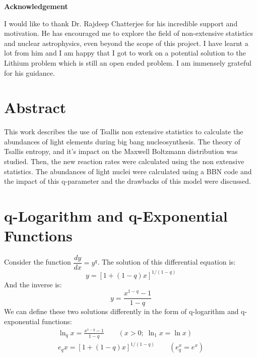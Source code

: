 \documentclass[11pt]{article}
\numberwithin{equation}{section}
\begin{document}
\begin{center}
  \Large\textbf{Acknowledgement}
\end{center}
I would like to thank Dr. Rajdeep Chatterjee for his incredible support and motivation. He has encouraged me to explore the field of non-extensive statistics and nuclear astrophysics, even beyond the scope of this project. I have learnt a lot from him and I am happy that I got to work on a potential solution to the Lithium problem which is still an open ended problem. I am immensely grateful for his guidance. 



\pagebreak
\tableofcontents
\pagebreak

\section{Abstract}

This work describes the use of Tsallis non extensive statistics to calculate the abundances of light elements during big bang nucleosynthesis. The theory of Tsallis entropy, and it's impact on the Maxwell Boltzmann distribution was studied. Then, the new reaction rates were calculated using the non extensive statistics. The abundances of light nuclei were calculated using a BBN code and the impact of this q-parameter and the drawbacks of this model were discussed. 
\pagebreak






\section{q-Logarithm and q-Exponential Functions}

Consider the function $\dfrac{dy}{dx}=y^q$. The solution of this differential equation is:
$$y=[1+(1-q)x]^{1/(1-q)}$$
And the inverse is:
$$y=\frac{x^{1-q}-1}{1-q}$$
We can define these two solutions differently in the form of q-logarithm and q-exponential functions:
\begin{align}
	\ln_q x=\frac{x^{1-q}-1}{1-q}  \qquad (x>0;\; \ln_1 x=\ln x) \label{eq:lnq}\\
	e_{q}x=[1+(1-q)x]^{1/(1-q)}   \qquad (e_q^x=e^x)          \label{eq:expq}
\end{align}
\end{document}
